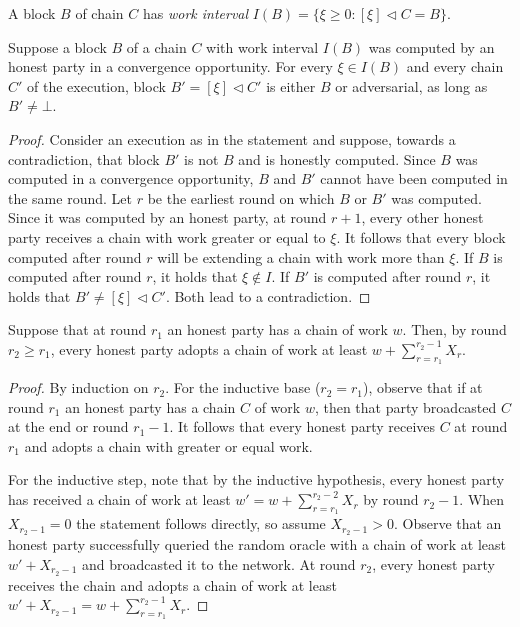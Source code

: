 \begin{definition}
  A block $B$ of chain $C$ has \emph{work interval}
  $I(B) = \{\xi \geq 0: [\xi] \lhd C = B\}$.
\end{definition}


\begin{lemma} \label{lem:pairing}
  Suppose a block $B$ of a chain $C$ with work interval $I(B)$
  was computed by an honest party in a convergence opportunity.
  For every $\xi \in I(B)$ and every chain $C'$ of the execution,
  block $B' = [\xi] \lhd C'$ is either $B$ or adversarial,
  as long as $B' \neq \bot$.
\end{lemma}
\begin{proof}
  Consider an execution as in the statement and suppose, towards a contradiction,
  that block $B'$ is not $B$ and is honestly computed.
  Since $B$ was computed in a convergence opportunity, $B$ and $B'$
  cannot have been computed in the same round. Let $r$ be the earliest round
  on which $B$ or $B'$ was computed. Since it was computed by
  an honest party, at round $r + 1$, every other honest party receives
  a chain with work greater or equal to $\xi$.
  It follows that every block computed
  after round $r$ will be extending a chain with work more than $\xi$.
  If $B$ is computed after round $r$, it holds that $\xi \not \in I$.
  If $B'$ is computed after round $r$, it holds that $B' \neq [\xi] \lhd C'$.
  Both lead to a contradiction. \Qed
\end{proof}

\begin{lemma}
  Suppose that at round $r_1$ an honest party has a chain of work $w$.
  Then, by round $r_2 \geq r_1$, every honest party adopts a chain of work at least
  $w + \sum_{r = r_1}^{r_2 - 1}{X_r}$.
\end{lemma}
\begin{proof}
  By induction on $r_2$. For the inductive base ($r_2 = r_1$), observe that
  if at round $r_1$ an honest party has a chain $C$ of work $w$, then
  that party broadcasted $C$ at the end or round $r_1 - 1$. It follows that
  every honest party receives $C$ at round $r_1$ and adopts a chain with
  greater or equal work.

  For the inductive step, note that by the inductive hypothesis,
  every honest party has received a chain of work at least $w' = w + \sum_{r = r_1}^{r_2 - 2}{X_r}$
  by round $r_2 - 1$. When $X_{r_2 - 1} = 0$ the statement follows directly, so assume
  $X_{r_2 - 1} > 0$. Observe that an honest party successfully queried the random oracle
  with a chain of work at least $w' + X_{r_2 - 1}$ and broadcasted it to the network.
  At round $r_2$, every honest party receives the chain and adopts a chain
  of work at least $w' + X_{r_2 - 1} = w + \sum_{r = r_1}^{r_2 - 1}{X_r}$. \Qed
\end{proof}

